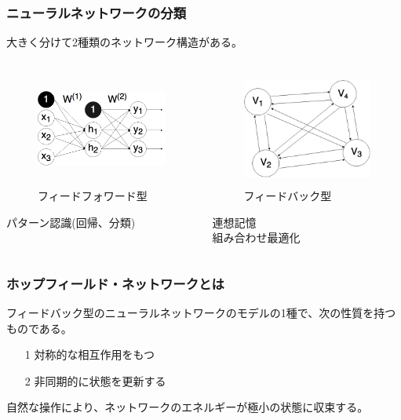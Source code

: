 \documentclass[dvipdfmx,11pt,notheorems]{beamer}
\theoremstyle{definition}
\begin{document}
\begin{frame}\frametitle{ニューラルネットワークの分類}
大きく分けて2種類のネットワーク構造がある。
\begin{columns}[T]		
\begin{column}[T]{5cm}
\begin{figure}[htbp]
	\includegraphics[height=3.8cm, width=5.5cm]{feedforward_networks.png}
	\caption{フィードフォワード型}
\end{figure}
パターン認識(回帰、分類)
\end{column}
\begin{column}[T]{5cm}
\begin{figure}[htbp]
	\includegraphics[height=3.8cm, width=5.5cm]{feedback_networks}
	\caption{フィードバック型}
\end{figure}
連想記憶 \\
組み合わせ最適化
\end{column}
\end{columns}
\end{frame}

\begin{frame}\frametitle{ホップフィールド・ネットワークとは}
フィードバック型のニューラルネットワークのモデルの1種で、次の性質を持つものである。
\vspace{0.5cm}
\begin{enumerate}
\item[1] 対称的な相互作用をもつ
\item[2] 非同期的に状態を更新する
\end{enumerate}
\vspace{0.5cm}
自然な操作により、ネットワークのエネルギーが極小の状態に収束する。
\end{frame}
\end{document}
